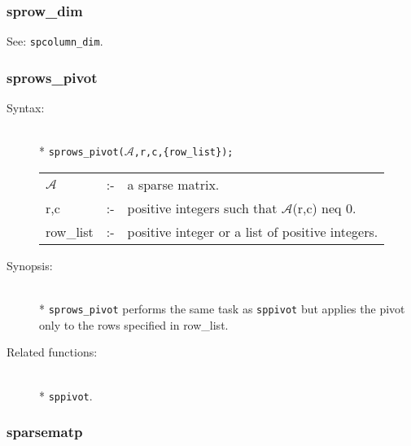 \subsubsection{sprow\_dim}
\label{sparse:sprow_dim}
\hypertarget{operator:SPROW_DIM}{}

See: \texttt{spcolumn\_dim}.


\subsubsection{sprows\_pivot}
\label{sparse:sprows_pivot}
\hypertarget{operator:SPROWS_PIVOT}{}

\begin{description}
\item[Syntax:]\mbox{}\\*
\texttt{sprows\_pivot($\mathcal{A}$,r,c,\{row\_list\});}\\[2mm]
\begin{tabular}{l l l}
$\mathcal{A}$ &:-& a sparse matrix. \\
r,c        &:-& positive integers such that $\mathcal{A}$(r,c) neq 0.\\
row\_list  &:-& positive integer or a list of positive integers.
\end{tabular}

\item[Synopsis:]\mbox{}\\*
\texttt{sprows\_pivot} performs the same task as \texttt{sppivot} but applies
the pivot only to the rows specified in row\_list.

\item[Related functions:]\mbox{}\\*
\texttt{sppivot}.
\end{description}

\subsubsection{sparsematp}
\label{sparse:sparsematp}
\hypertarget{operator:SPARSEMATP}{}

